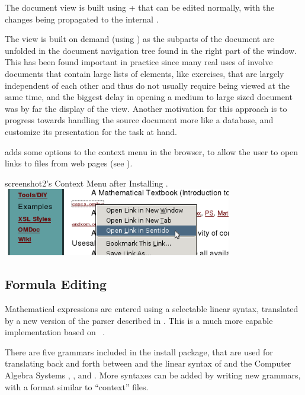 The document view is built using
{\xhtml} + {\mathml} that can be edited normally,
with the changes being propagated to the internal {\omdoc}.

The view is built on demand (using {\xslt}) as the subparts of the
document are unfolded
in the document navigation tree found in the right part of the window.
This has
been found important in practice since many real uses of {\omdoc} involve
documents that contain large lists of elements, like exercises, that are
largely independent of each other and thus do not usually require being
viewed at the same time, and the biggest delay in opening a medium to
large sized document was by far the display of the {\xhtml} view.
Another motivation for this approach is to progress towards handling the
source document more like a database, and customize its presentation
for the task at hand.

{\sentido} adds some options to the context menu in the browser,
to allow the user to open links to {\omdoc} files from web pages (see {}).

\begin{myfig}{screenshot2}{{\mozilla}'s Context Menu after Installing {\sentido}.}
  \includegraphics[width=10cm]{projects/sentido/sentido_context_menu_open_link_detail}
\end{myfig}

\subsection{Formula Editing}

Mathematical expressions are entered using a selectable linear syntax,
translated by a new version of the {\qmath} parser described in
{}. This is a much more capable implementation
based on {}~\cite{abney96partial}.

There are five grammars included in the install package, that are
used for translating back and forth between {\openmath} and the linear
syntax of {\qmath} and the Computer Algebra Systems
{\maxima}, {\yacas}, {\maple} and {\mathematica}.
More syntaxes can be added by writing new grammars, with a format
similar to {\qmath} ``context'' files.

